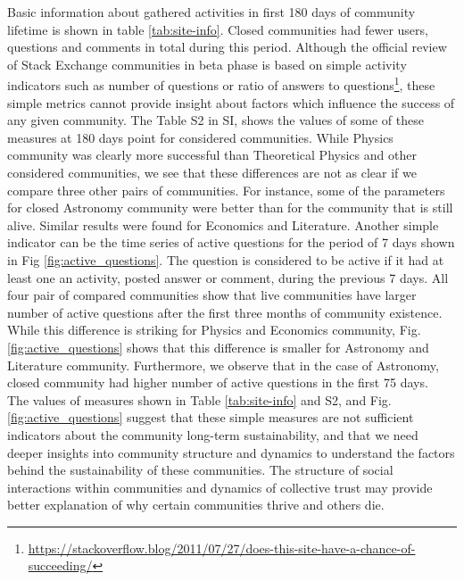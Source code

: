 Basic information about gathered activities in first 180 days of community lifetime is shown in table \ref{tab:site-info}. Closed communities had fewer users, questions and comments in total during this period. Although the official review of Stack Exchange communities in beta phase is based on simple activity indicators such as number of questions or ratio of answers to questions\footnote{\href{https://stackoverflow.blog/2011/07/27/does-this-site-have-a-chance-of-succeeding/}{https://stackoverflow.blog/2011/07/27/does-this-site-have-a-chance-of-succeeding/}}, these simple metrics cannot provide insight about factors which influence the success of any given community. The Table S2 in SI, shows the values of some of these measures at 180 days point for considered communities. While Physics community was clearly more successful than Theoretical Physics and other considered communities, we see that these differences are not as clear if we compare three other pairs of communities. For instance, some of the parameters for closed Astronomy community were better than for the community that is still alive. Similar results were found for Economics and Literature. Another simple indicator can be the time series of active questions for the period of 7 days shown in Fig \ref{fig:active_questions}. The question is considered to be active if it had at least one an activity, posted answer or comment, during the previous 7 days. All four pair of compared communities show that live communities have larger number of active questions after the first three months of community existence. While this difference is striking for Physics and Economics community, Fig. \ref{fig:active_questions} shows that this difference is smaller for Astronomy and Literature community. Furthermore, we observe that in the case of Astronomy, closed community had higher number of active questions in the first 75 days. \\
The values of measures shown in Table \ref{tab:site-info} and S2, and Fig. \ref{fig:active_questions} suggest that these simple measures are not sufficient indicators about the community long-term sustainability, and that we need deeper insights into community structure and dynamics to understand the factors behind the sustainability of these communities. The structure of social interactions within communities and dynamics of collective trust may provide better explanation of why certain communities thrive and others die.  


